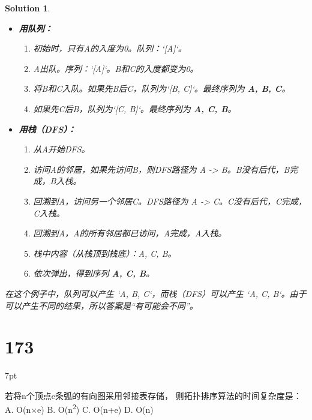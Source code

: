 \documentclass[UTF8]{report}
\newtheorem{solution}{Solution}
\theoremstyle{MyLineTheoremStyle} %
\theoremstyle{MyBlockTheoremStyle} %
\theoremstyle{MySubsubsectionStyle} %
\newenvironment{graybox}{%
        \def\FrameCommand{%
        \hspace{1pt}%
        {\color{gray}\small \vrule width 2pt}%
        {\color{graybox_color}\vrule width 4pt}%
        \colorbox{graybox_color}%
        }%
        \MakeFramed{\advance\hsize-\width\FrameRestore}%
        \noindent\hspace{-4.55pt}%
        \begin{adjustwidth}{}{7pt}%
        \vspace{2pt}\vspace{2pt}%
        }
        {%
        \vspace{2pt}\end{adjustwidth}\endMakeFramed%
        }
\begin{document}
\begin{solution}
\begin{itemize}
    \item \textbf{用队列：}
    \begin{enumerate}
        \item 初始时，只有A的入度为0。队列：`[A]`。
        \item A出队。序列：`[A]`。B和C的入度都变为0。
        \item 将B和C入队。如果先B后C，队列为`[B, C]`。最终序列为 \textbf{A, B, C}。
        \item 如果先C后B，队列为`[C, B]`。最终序列为 \textbf{A, C, B}。
    \end{enumerate}
    \item \textbf{用栈（DFS）：}
    \begin{enumerate}
        \item 从A开始DFS。
        \item 访问A的邻居，如果先访问B，则DFS路径为 A -> B。B没有后代，B完成，B入栈。
        \item 回溯到A，访问另一个邻居C。DFS路径为 A -> C。C没有后代，C完成，C入栈。
        \item 回溯到A，A的所有邻居都已访问，A完成，A入栈。
        \item 栈中内容（从栈顶到栈底）：A, C, B。
        \item 依次弹出，得到序列 \textbf{A, C, B}。
    \end{enumerate}
\end{itemize}

在这个例子中，队列可以产生 `A, B, C`，而栈（DFS）可以产生 `A, C, B`。由于可以产生不同的结果，所以答案是“有可能会不同”。
\end{solution}

\section*{173}
\begin{graybox}
若将n个顶点e条弧的有向图采用邻接表存储，
则拓扑排序算法的时间复杂度是：
A. O(n×e)
B. O(n\textsuperscript{2})
C. O(n+e)
D. O(n)
\end{graybox}
\end{document}
